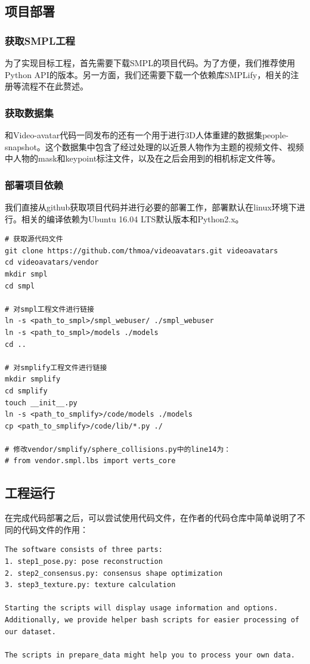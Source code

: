 \documentclass{article}
\begin{document}
\subsection{项目部署}
\subsubsection{获取SMPL工程}
为了实现目标工程，首先需要下载SMPL的项目代码\cite{smplhomepage}。为了方便，我们推荐使用Python API的版本。另一方面，我们还需要下载一个依赖库SMPLify\cite{smplifyhomepage}，相关的注册等流程不在此赘述。

\subsubsection{获取数据集}
和Video-avatar代码一同发布的还有一个用于进行3D人体重建的数据集people-snapshot\cite{paper1homepage}。这个数据集中包含了经过处理的以近景人物作为主题的视频文件、视频中人物的mask和keypoint标注文件，以及在之后会用到的相机标定文件等。

\subsubsection{部署项目依赖}
我们直接从github\cite{paper1code}获取项目代码并进行必要的部署工作，部署默认在linux环境下进行。相关的编译依赖为Ubuntu 16.04 LTS默认版本和Python2.x。

\begin{lstlisting} 
# 获取源代码文件
git clone https://github.com/thmoa/videoavatars.git videoavatars
cd videoavatars/vendor
mkdir smpl
cd smpl

# 对smpl工程文件进行链接
ln -s <path_to_smpl>/smpl_webuser/ ./smpl_webuser
ln -s <path_to_smpl>/models ./models
cd ..

# 对smplify工程文件进行链接
mkdir smplify
cd smplify
touch __init__.py
ln -s <path_to_smplify>/code/models ./models
cp <path_to_smplify>/code/lib/*.py ./

# 修改vendor/smplify/sphere_collisions.py中的line14为：
# from vendor.smpl.lbs import verts_core
\end{lstlisting}

\subsection{工程运行}
在完成代码部署之后，可以尝试使用代码文件，在作者的代码仓库中简单说明了不同的代码文件的作用：

\begin{lstlisting} 
The software consists of three parts:
1. step1_pose.py: pose reconstruction
2. step2_consensus.py: consensus shape optimization
3. step3_texture.py: texture calculation

Starting the scripts will display usage information and options.
Additionally, we provide helper bash scripts for easier processing of 
our dataset.

The scripts in prepare_data might help you to process your own data.
\end{lstlisting}
\end{document}
